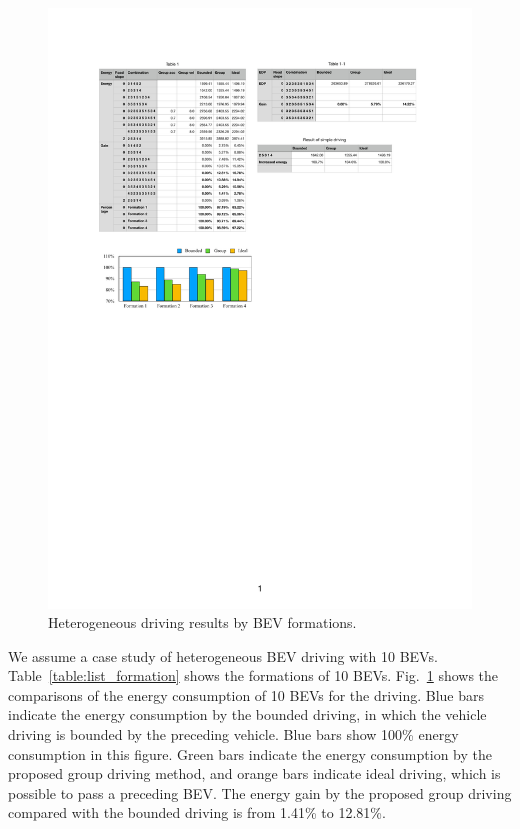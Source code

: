 \documentclass{IEEEtran}
\begin{document}
\begin{figure}	%
\centering
\includegraphics[width=1.0\hsize]{Figures/Bar_graph.pdf}
\caption{Heterogeneous driving results by BEV formations.}
\label{fig:bar_graph}
\end{figure} 

We assume a case study of heterogeneous BEV driving with 10 BEVs. Table~\ref{table:list_formation} shows the formations of 10 BEVs. 
Fig.~\ref{fig:bar_graph} shows the comparisons of the energy consumption of 10 BEVs for the driving. Blue bars indicate the energy consumption by the bounded driving, in which the vehicle driving is bounded by the preceding vehicle. Blue bars show 100\% energy consumption in this figure. Green bars indicate the energy consumption by the proposed group driving method, and orange bars indicate ideal driving, which is possible to pass a preceding BEV.
The energy gain by the proposed group driving compared with the bounded driving is from 1.41\% to 12.81\%. 
\end{document}
